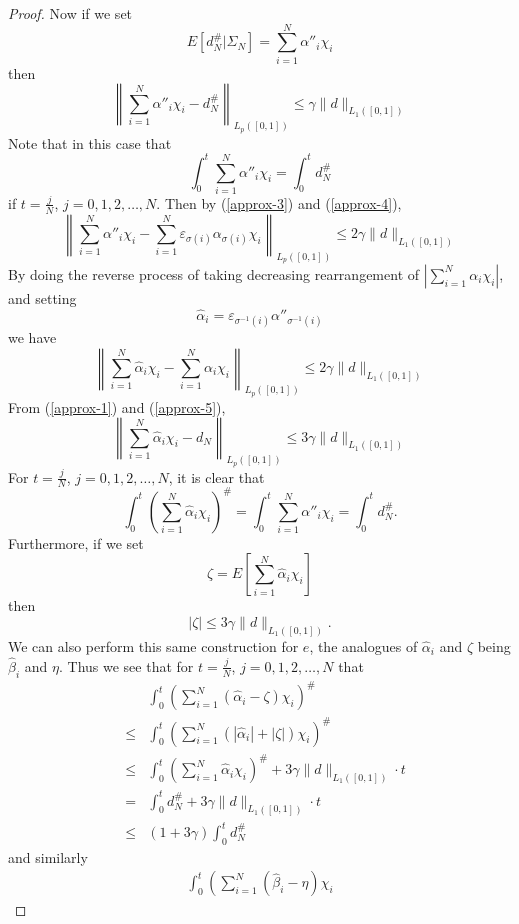 \documentclass[12pt]{amsart}
\begin{document}
\begin{proof}
Now if we set $$E[d^\#_N|\Sigma_N]=\sum_{i=1}^N \alpha''_i
\chi_i$$ then
\begin{equation}
\label{approx-4} \left\|\sum_{i=1}^N \alpha''_i\chi_i -d^\#_N
\right\|_{L_p([0,1])} \le \gamma \|d\|_{L_1([0,1])}
\end{equation}
Note that in this case that
\[
\int_0^t \sum_{i=1}^N \alpha''_i\chi _i=\int_0^t d^\#_N
\]
if $t=\frac{j}{N}$, $j=0,1,2,\dots,N$. Then by (\ref{approx-3})
and (\ref{approx-4}),
\[
\left\|\sum_{i=1}^N \alpha''_i\chi_i- \sum_{i=1}^N
\varepsilon_{\sigma (i)}\alpha _{\sigma (i)}\chi _i
\right\|_{L_p([0,1])} \le 2 \gamma \|d\|_{L_1([0,1])}
\]
By doing the reverse process of taking decreasing rearrangement of
$|\sum_{i=1}^N \alpha _i\chi _i|$, and setting
\[ \hat \alpha_i =
   \varepsilon_{\sigma^{-1}(i)}\alpha''_{\sigma^{-1}(i)} \]
we have
\begin{equation}
\label{approx-5} \left\|\sum_{i=1}^N \hat \alpha_i \chi_i -
       \sum_{i=1}^N \alpha _i\chi _i \right\|_{L_p([0,1])} \le
       2 \gamma \| d\|_{L_1([0,1])}
\end{equation}
 From (\ref{approx-1}) and (\ref{approx-5}),
\[
\left\|\sum_{i=1}^N \hat \alpha_i \chi_i-d_N \right\|_{L_p([0,1])}
       \le 3 \gamma \|d\|_{L_1([0,1])}
\]
For $t=\frac{j}{N}$, $j=0,1,2,\dots,N$, it is clear that
\[\int_0^t \left( \sum_{i=1}^N \hat{\alpha }_i\chi _i \right)^\# =
\int_0^t \sum_{i=1}^N \alpha'' _i\chi _i=\int_0^t d^\#_N.\]
Furthermore, if we set
\[ \zeta = E\left[\sum_{i=1}^N \hat{\alpha }_i\chi_i\right] \]
then $$|\zeta| \le 3 \gamma\|d\|_{L_1([0,1])}.$$ We can also
perform this same construction for $e$, the analogues of $\hat
\alpha_i$ and $\zeta$ being $\hat\beta_i$ and $\eta$. Thus we see
that for $t=\frac{j}{N}$, $j=0,1,2,\dots,N$ that
\begin{eqnarray}
\label{int ineq seq}
& &\int_0^t \left(\sum_{i=1}^N \left(\hat{\alpha}_i-\zeta \right)\chi _i \right)^\# \\
& \leq &\int_0^t\left(\sum_{i=1}^N\left(|\hat{\alpha}_i|+|\zeta |\right)\chi _i \right)^\#\nonumber\\
& \leq &\int_0^t \left( \sum_{i=1}^N \hat{\alpha}_i\chi _i
\right)^\# +
3\gamma \|d\|_{L_1([0,1])} \cdot t\nonumber\\
& =& \int_0^t d^\#_N + 3\gamma \|d\|_{L_1([0,1])} \cdot t\nonumber\\
& \leq & (1+3\gamma)\int_0^t d^\#_N \nonumber
\end{eqnarray}
and similarly
\begin{eqnarray}
\label{int approx} \int_0^t
\left(\sum_{i=1}^N\left(\hat{\beta}_i-\eta \right)\chi _i

\end{eqnarray}
\end{proof}
\end{document}

